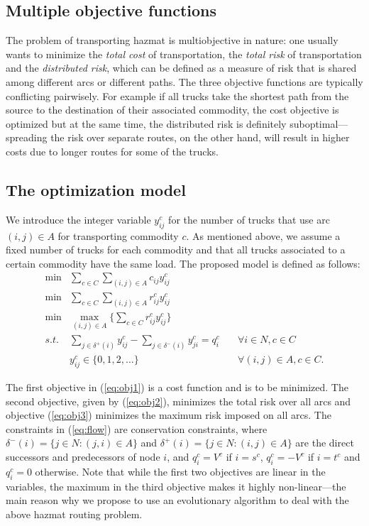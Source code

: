 \documentclass[preprint,12pt]{elsarticle}
\begin{document}
\subsection{Multiple objective functions} \label{SS_MOF}
The problem of transporting hazmat is multiobjective in nature: one usually wants to minimize the \textit{total cost} of transportation, the \textit{total risk} of transportation and the {\em distributed risk}, which can be defined as a measure of risk that is shared among different arcs or different paths. The three objective functions are typically conflicting pairwisely. For example if all trucks take the shortest path from the source to the destination of their associated commodity, the cost objective is optimized but at the same time, the distributed risk is definitely suboptimal---spreading the risk over separate routes, on the other hand, will result in higher costs due to longer routes for some of the trucks.

\subsection{The optimization model} \label{SS_AOM}
We introduce the integer variable $y_{ij}^c$ for the number of trucks that use arc $(i,j)\in A$ for transporting commodity $c$. As mentioned above, we assume a fixed number of trucks for each commodity and that all trucks associated to a certain commodity have the same load. The proposed model is defined as follows:
\begin{eqnarray}
   \min  & \sum_{c \in C}\limits \sum_{(i,j) \in A}\limits c_{ij} y_{ij}^c & \label{eq:obj1}\\
   \min  & \sum_{c \in C}\limits \sum_{(i,j) \in A}\limits r_{ij}^{c} y_{ij}^c & \label{eq:obj2}\\
   \min  & \max_{(i,j)\in A}\limits \big\{ \sum_{c \in C}\limits r_{ij}^{c} y_{ij}^c \big\} & \label{eq:obj3}\\
    s.t. & \sum_{j \in \delta^+(i)}\limits y_{ij}^c -  \sum_{j \in \delta^-(i)}\limits y_{ji}^c = q_i^c\quad         & \forall i \in N,  c \in  C \label{eq:flow} \\
         & y_{ij}^c \in \{0, 1, 2, \ldots\}                                                            & \forall (i,j)\in A, c\in C\label{eq:integerY}.
\end{eqnarray}

The first objective in (\ref{eq:obj1}) is a cost function and is to be minimized. The second objective, given by (\ref{eq:obj2}), minimizes the total risk over all arcs and objective (\ref{eq:obj3}) minimizes the maximum risk imposed on all arcs. The constraints in (\ref{eq:flow}) are conservation constraints, where $\delta^-(i) = \{j \in N: (j,i)\in A\}$ and $\delta^+(i) = \{j \in N: (i,j)\in A\}$ are the direct successors and predecessors of node $i$, and $q_i^c=V^c$ if  $i=s^c$, $q_i^c=-V^c$ if  $i=t^c$ and $q_i^c=0$ otherwise. Note that while the first two objectives are linear in the variables, the maximum in the third objective makes it highly non-linear---the main reason why we propose to use an evolutionary algorithm to deal with the above hazmat routing problem.
\end{document}
